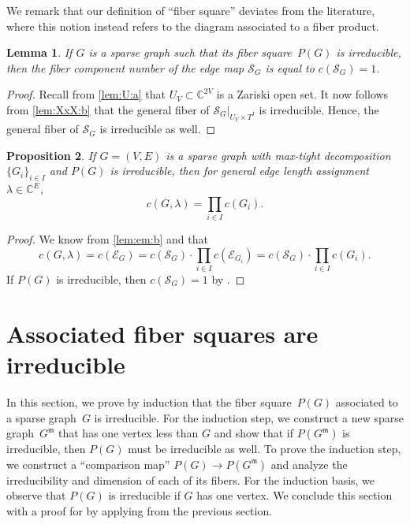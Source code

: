 \documentclass[12pt]{article}
\newtheorem{lemma}{Lemma}
\newtheorem{proposition}[lemma]{Proposition}
\theoremstyle{definition}
\newcommand{\RL}[2]{\Cref{lem:#1}\ref{lem:#1:#2}}
\newcommand{\st}{such that }
\newcommand{\C}{{\mathbb{C}}}
\newcommand{\cE}{\mathcal{E}}
\newcommand{\cS}{\mathcal{S}}
\newcommand{\m}{\mathfrak{m}}
\begin{document}
We remark that our definition of ``fiber square'' deviates from the literature, where this notion
instead refers to the diagram associated to a fiber product.

\begin{lemma}
\label{lem:cS}
If $G$ is a sparse graph \st its fiber square~$P(G)$ is irreducible, then
the fiber component number of the edge map $\cS_G$ is equal to
$c(\cS_G)=1$.
\end{lemma}

\begin{proof}
Recall from \RL{U}{a} that $U_V\subset\C^{2V}$ is a Zariski open set.
It now follows from \RL{XxX}{b} that the general fiber of $\cS_G|_{U_V\times T^I}$
is irreducible. Hence, the general fiber
of $\cS_G$ is irreducible as well.
\end{proof}

\begin{proposition}
\label{prp:main}
If $G=(V,E)$ is a sparse graph
with max-tight decomposition $\{G_i\}_{i\in I}$
and $P(G)$ is irreducible,
then for general edge length assignment $\lambda\in\C^E$,
\[
c(G,\lambda)=\prod_{i\in I} c(G_i).
\]
\end{proposition}

\begin{proof}
We know from \RL{em}{b} and  that
\[
c(G,\lambda)=c(\cE_G)=c(\cS_G)\cdot \prod_{i\in I} c(\cE_{G_i})=c(\cS_G)\cdot\prod_{i\in I} c(G_i).
\]
If $P(G)$ is irreducible, then $c(\cS_G)=1$ by .
\end{proof}


\section{Associated fiber squares are irreducible}
\label{sec:red}

In this section, we prove by induction that the
fiber square~$P(G)$ associated to a sparse graph~$G$ is irreducible.
For the induction step,
we construct a new sparse graph~$G^\m$ that has one vertex less than $G$
and show that if $P(G^\m)$ is irreducible, then $P(G)$ must be irreducible as well.
To prove the induction step, we construct a ``comparison map'' $P(G)\to P(G^\m)$
and analyze the irreducibility and dimension of each of its fibers.
For the induction basis, we observe that $P(G)$ is irreducible if $G$ has one vertex.
We conclude this section with a proof for 
by applying  from the previous section.
\end{document}

